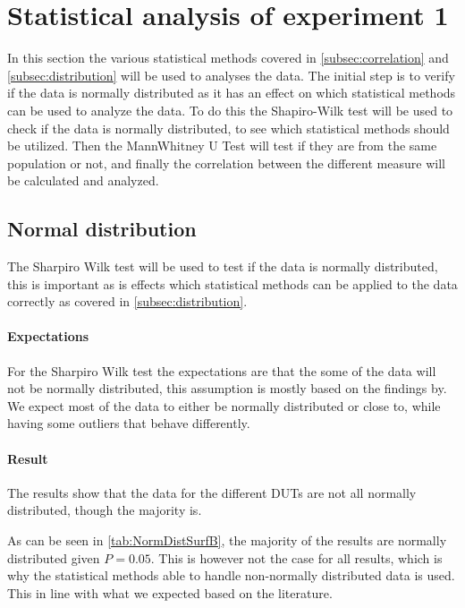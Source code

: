 \section{Statistical analysis of experiment 1}\label{sub:Stat1}

In this section the various statistical methods covered in \cref{subsec:correlation} and \cref{subsec:distribution} will be used to analyses the data. The initial step is to verify if the data is normally distributed as it has an effect on which statistical methods can be used to analyze the data. To do this the Shapiro-Wilk test will be used to check if the data is normally distributed, to see which statistical methods should be utilized. Then the MannWhitney U Test will test if they are from the same population or not, and finally the correlation between the different measure will be calculated and analyzed.

\subsection{Normal distribution}\label{subsec:NormalDist1}

The Sharpiro Wilk test will be used to test if the data is normally distributed, this is important as is effects which statistical methods can be applied to the data correctly as covered in \cref{subsec:distribution}. 

\paragraph{Expectations}
For the Sharpiro Wilk test the expectations are that the some of the data will not be normally distributed, this assumption is mostly based on the findings by\cite{Koedijk2022diff}. We expect most of the data to either be normally distributed or close to, while having some outliers that behave differently.

\paragraph{Result}
The results show that the data for the different DUTs are not all normally distributed, though the majority is.

As can be seen in \cref{tab:NormDistSurfB}, the majority of the results are normally distributed given $P = 0.05$. This is however not the case for all results, which is why the statistical methods able to handle non-normally distributed data is used. This in line with what we expected based on the literature.

